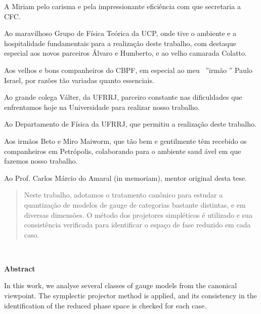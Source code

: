 \documentclass[a4paper,thmsa,12pt]{report}
\begin{document}
A Miriam pelo carisma e pela impressionante efici\^encia com que secretaria a CFC.

Ao maravilhoso Grupo de F\'{i}sica Te\'{o}rica da UCP, onde tive o ambiente
e a hospitalidade fundamentais para a realiza\c{c}\~{a}o deste trabalho, com
destaque especial aos novos parceiros \'{A}lvaro e  Humberto, e ao velho
camarada  Colatto.

Aos velhos e bons companheiros do CBPF, em especial ao meu \ ''irm\~{a}o ''
Paulo Israel, por raz\~{o}es t\~{a}o variadas quanto essenciais.

Ao grande colega V\'{a}lter, da UFRRJ, parceiro constante nas dificuldades
que enfrentamos hoje na Universidade  para realizar nosso trabalho.

Ao Departamento de F\'{i}sica da UFRRJ, que permitiu a realiza\c{c}\~{a}o
deste trabalho.

Aos irm\~{a}os Beto e Miro Maiworm, que t\~{a}o bem e gentilmente t\^{e}m
recebido os companheiros em Petr\'{o}polis, colaborando para o ambiente saud%
\'{a}vel em que fazemos nosso trabalho.

Ao Prof. Carlos M\'{a}rcio do Amaral (in memoriam), mentor original
desta tese.

\newpage

\thispagestyle{empty}
\begin{abstract}

Neste trabalho, adotamos o tratamento can\^onico para estudar a quantiza\c c\~ao de
mo\-de\-los de gauge de categorias bastante distintas, e em diversas dimens\~oes. 
O m\'{e}todo dos projetores simpl\'{e}ticos \'{e} utilizado e sua consist\^{e}ncia 
verificada para identificar o espa\c{c}o de fase reduzido em cada caso.

\end{abstract}

\newpage 
~\vspace{6cm}
\thispagestyle{empty} 
\centerline{\bf Abstract}

\bigskip

In this work, we analyse several classes of gauge models from the canonical
viewpoint. The symplectic projector method is applied, and its consistency in the
identification of the reduced phase space is checked for each case.

\newpage

\tableofcontents
\thispagestyle{empty}

\chapter{\protect{}}
\end{document}

